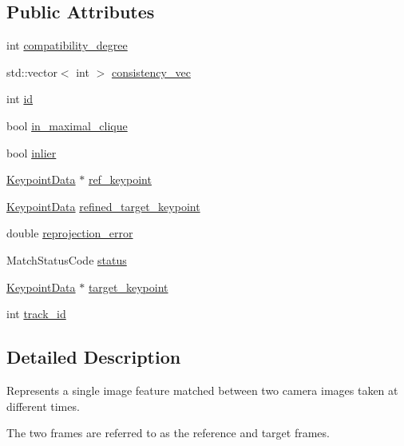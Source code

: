 \subsection*{Public Attributes}
\begin{DoxyCompactItemize}
\item 
int \hyperlink{classfovis_1_1FeatureMatch_ae5fb6416f0d1fa278a22570505e05e13}{compatibility\_\-degree}
\item 
std::vector$<$ int $>$ \hyperlink{classfovis_1_1FeatureMatch_a92a84284bf0e8709364e0250c1063257}{consistency\_\-vec}
\item 
int \hyperlink{classfovis_1_1FeatureMatch_a7441ef0865bcb3db9b8064dd7375c1ea}{id}
\item 
bool \hyperlink{classfovis_1_1FeatureMatch_ab94bc799c5558ad8bcc29d94b478f292}{in\_\-maximal\_\-clique}
\item 
bool \hyperlink{classfovis_1_1FeatureMatch_af5eefbf5c8382030e20e4a7ae064987f}{inlier}
\item 
\hyperlink{classfovis_1_1KeypointData}{KeypointData} $\ast$ \hyperlink{classfovis_1_1FeatureMatch_a63211a4e001cec95acf8363b81af1216}{ref\_\-keypoint}
\item 
\hyperlink{classfovis_1_1KeypointData}{KeypointData} \hyperlink{classfovis_1_1FeatureMatch_ac7bde8fda75951ab16ca9ed8adfe2118}{refined\_\-target\_\-keypoint}
\item 
double \hyperlink{classfovis_1_1FeatureMatch_aed648d3f72076806d79f7c4c78151487}{reprojection\_\-error}
\item 
MatchStatusCode \hyperlink{classfovis_1_1FeatureMatch_a5a17170db3bee9a227cb28782b9532a7}{status}
\item 
\hyperlink{classfovis_1_1KeypointData}{KeypointData} $\ast$ \hyperlink{classfovis_1_1FeatureMatch_a85a2bf617b8f5152083f5acda254a61c}{target\_\-keypoint}
\item 
int \hyperlink{classfovis_1_1FeatureMatch_a8e64acfab4c3eba5b36eb3b6f15b9434}{track\_\-id}
\end{DoxyCompactItemize}


\subsection{Detailed Description}
Represents a single image feature matched between two camera images taken at different times. 

The two frames are referred to as the reference and target frames. 

